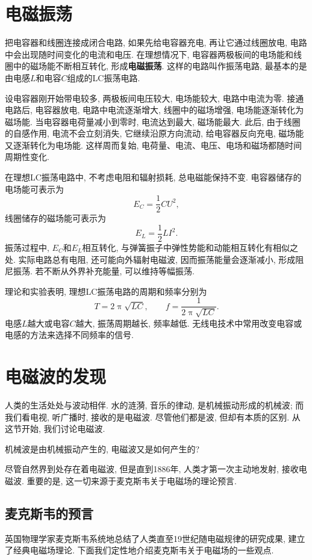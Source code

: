 \documentclass[11pt,a4paper]{ctexbook}
\begin{document}
\section{电磁振荡}

把电容器和线圈连接成闭合电路, 如果先给电容器充电, 再让它通过线圈放电, 电路中会出现随时间变化的电流和电压.
在理想情况下, 电容器两极板间的电场能和线圈中的磁场能不断相互转化, 形成\textbf{电磁振荡}. 这样的电路叫作振荡电路,
最基本的是由电感$L$和电容$C$组成的LC振荡电路.

设电容器刚开始带电较多, 两极板间电压较大, 电场能较大, 电路中电流为零. 接通电路后,
电容器放电, 电路中电流逐渐增大, 线圈中的磁场增强, 电场能逐渐转化为磁场能. 当电容器电荷量减小到零时,
电流达到最大, 磁场能最大. 此后, 由于线圈的自感作用, 电流不会立刻消失, 它继续沿原方向流动,
给电容器反向充电, 磁场能又逐渐转化为电场能. 这样周而复始, 电荷量、电流、电压、电场和磁场都随时间周期性变化.

在理想LC振荡电路中, 不考虑电阻和辐射损耗, 总电磁能保持不变. 电容器储存的电场能可表示为
$$E_C=\frac12CU^2,$$
线圈储存的磁场能可表示为
$$E_L=\frac12LI^2.$$
振荡过程中, $E_C$和$E_L$相互转化, 与弹簧振子中弹性势能和动能相互转化有相似之处.
实际电路总有电阻, 还可能向外辐射电磁波, 因而振荡能量会逐渐减小, 形成阻尼振荡.
若不断从外界补充能量, 可以维持等幅振荡.

理论和实验表明, 理想LC振荡电路的周期和频率分别为
$$T=2\uppi\sqrt{LC},\qquad f=\frac{1}{2\uppi\sqrt{LC}}.$$
电感$L$越大或电容$C$越大, 振荡周期越长, 频率越低. 无线电技术中常用改变电容或电感的方法来选择不同频率的信号.

\section{电磁波的发现}

人类的生活处处与波动相伴. 水的涟漪, 音乐的律动, 是机械振动形成的机械波;
而我们看电视, 听广播时, 接收的是电磁波.
尽管他们都是波, 但却有本质的区别. 从这节开始, 我们讨论电磁波.

机械波是由机械振动产生的, 电磁波又是如何产生的?

尽管自然界到处存在着电磁波, 但是直到1886年, 人类才第一次主动地发射, 接收电磁波.
重要的是, 这一切来源于麦克斯韦关于电磁场的理论预言.

\subsection{麦克斯韦的预言}
\label{电磁场理论}

英国物理学家麦克斯韦系统地总结了人类直至19世纪随电磁规律的研究成果,
建立了经典电磁场理论. 下面我们定性地介绍麦克斯韦关于电磁场的一些观点.
\end{document}
